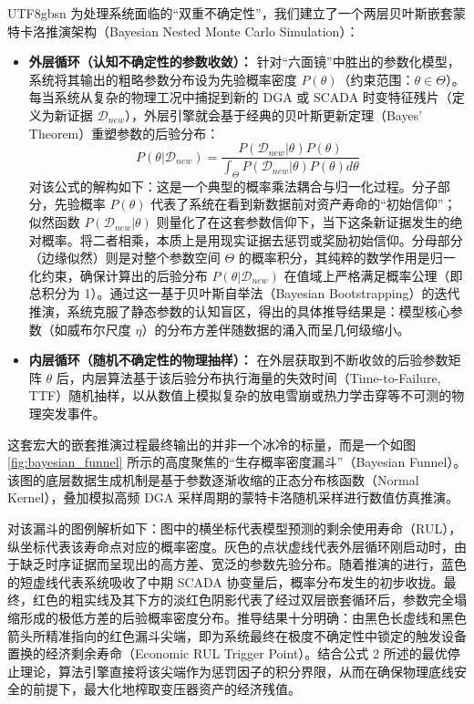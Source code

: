 \documentclass[journal]{IEEEtran}
\begin{document}
\begin{CJK*}{UTF8}{gbsn}
为处理系统面临的“双重不确定性”，我们建立了一个两层贝叶斯嵌套蒙特卡洛推演架构（Bayesian Nested Monte Carlo Simulation）：
\begin{itemize}
    \item \textbf{外层循环（认知不确定性的参数收敛）：} 针对“六面镜”中胜出的参数化模型，系统将其输出的粗略参数分布设为先验概率密度 $P(\theta)$（约束范围：$\theta \in \Theta$）。每当系统从复杂的物理工况中捕捉到新的 DGA 或 SCADA 时变特征残片（定义为新证据 $\mathcal{D}_{new}$），外层引擎就会基于经典的贝叶斯更新定理（Bayes' Theorem）重塑参数的后验分布：
    \begin{equation}
    P(\theta | \mathcal{D}_{new}) = \frac{ P(\mathcal{D}_{new} | \theta) P(\theta) }{ \int_{\Theta} P(\mathcal{D}_{new} | \theta) P(\theta) d\theta }
    \end{equation}
    对该公式的解构如下：这是一个典型的概率乘法耦合与归一化过程。分子部分，先验概率 $P(\theta)$ 代表了系统在看到新数据前对资产寿命的“初始信仰”；似然函数 $P(\mathcal{D}_{new} | \theta)$ 则量化了在这套参数信仰下，当下这条新证据发生的绝对概率。将二者相乘，本质上是用现实证据去惩罚或奖励初始信仰。分母部分（边缘似然）则是对整个参数空间 $\Theta$ 的概率积分，其纯粹的数学作用是归一化约束，确保计算出的后验分布 $P(\theta | \mathcal{D}_{new})$ 在值域上严格满足概率公理（即总积分为 1）。通过这一基于贝叶斯自举法（Bayesian Bootstrapping）的迭代推演，系统克服了静态参数的认知盲区，得出的具体推导结果是：模型核心参数（如威布尔尺度 $\eta$）的分布方差伴随数据的涌入而呈几何级缩小。
    
    \item \textbf{内层循环（随机不确定性的物理抽样）：} 在外层获取到不断收敛的后验参数矩阵 $\theta$ 后，内层算法基于该后验分布执行海量的失效时间（Time-to-Failure, TTF）随机抽样，以从数值上模拟复杂的放电雪崩或热力学击穿等不可测的物理突发事件。
\end{itemize}

这套宏大的嵌套推演过程最终输出的并非一个冰冷的标量，而是一个如图 \ref{fig:bayesian_funnel} 所示的高度聚焦的“生存概率密度漏斗”（Bayesian Funnel）。该图的底层数据生成机制是基于参数逐渐收缩的正态分布核函数（Normal Kernel），叠加模拟高频 DGA 采样周期的蒙特卡洛随机采样进行数值仿真推演。

对该漏斗的图例解析如下：图中的横坐标代表模型预测的剩余使用寿命（RUL），纵坐标代表该寿命点对应的概率密度。灰色的点状虚线代表外层循环刚启动时，由于缺乏时序证据而呈现出的高方差、宽泛的参数先验分布。随着推演的进行，蓝色的短虚线代表系统吸收了中期 SCADA 协变量后，概率分布发生的初步收拢。最终，红色的粗实线及其下方的淡红色阴影代表了经过双层嵌套循环后，参数完全塌缩形成的极低方差的后验概率密度分布。推导结果十分明确：由黑色长虚线和黑色箭头所精准指向的红色漏斗尖端，即为系统最终在极度不确定性中锁定的触发设备置换的经济剩余寿命（Economic RUL Trigger Point）。结合公式 2 所述的最优停止理论，算法引擎直接将该尖端作为惩罚因子的积分界限，从而在确保物理底线安全的前提下，最大化地榨取变压器资产的经济残值。


\end{CJK*}
\end{document}
